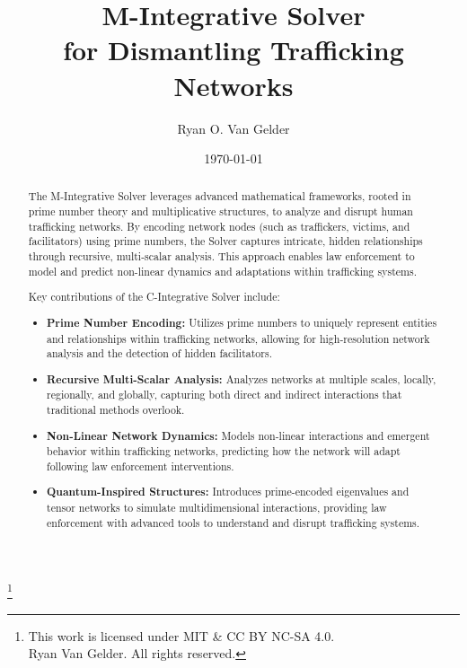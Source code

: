 \documentclass[%
 preprint, linenumbers,
 amsmath,amssymb,
 aps, physrev,
]{revtex4-2}
\begin{document}
\title{\textbf{M-Integrative Solver\\for Dismantling Trafficking Networks} 
}%


\author{Ryan O. Van Gelder}
%
\thanks{This work is licensed under MIT & CC BY NC-SA 4.0. \\  Ryan Van Gelder. All rights reserved.}
\date{\today}%


\begin{abstract}
The M-Integrative Solver leverages advanced mathematical frameworks, rooted in prime number theory and multiplicative structures, to analyze and disrupt human trafficking networks. By encoding network nodes (such as traffickers, victims, and facilitators) using prime numbers, the Solver captures intricate, hidden relationships through recursive, multi-scalar analysis. This approach enables law enforcement to model and predict non-linear dynamics and adaptations within trafficking systems.

Key contributions of the C-Integrative Solver include:
\begin{itemize}
    \item \textbf{Prime Number Encoding:} Utilizes prime numbers to uniquely represent entities and relationships within trafficking networks, allowing for high-resolution network analysis and the detection of hidden facilitators.
    \item \textbf{Recursive Multi-Scalar Analysis:} Analyzes networks at multiple scales, locally, regionally, and globally, capturing both direct and indirect interactions that traditional methods overlook.
    \item \textbf{Non-Linear Network Dynamics:} Models non-linear interactions and emergent behavior within trafficking networks, predicting how the network will adapt following law enforcement interventions.
    \item \textbf{Quantum-Inspired Structures:} Introduces prime-encoded eigenvalues and tensor networks to simulate multidimensional interactions, providing law enforcement with advanced tools to understand and disrupt trafficking systems.
\end{itemize}
\end{abstract}

\maketitle
\end{document}
